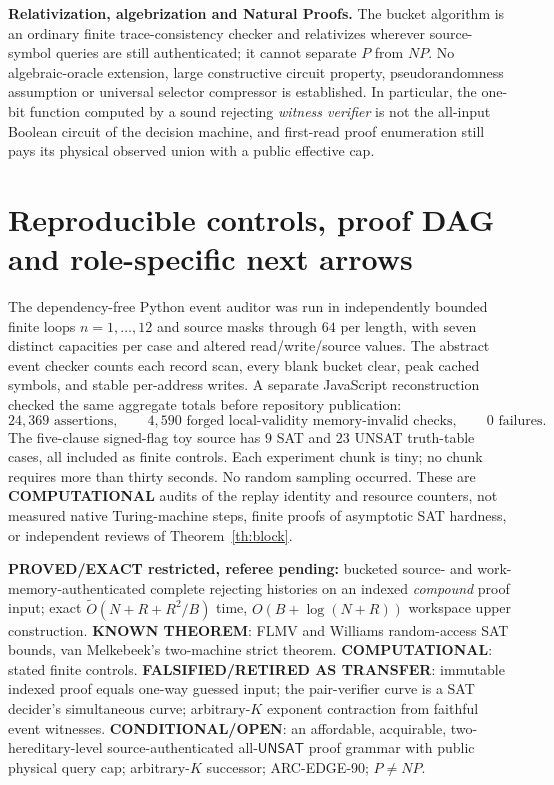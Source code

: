 \documentclass[11pt]{article}
\newcommand{\UNSAT}{\mathsf{UNSAT}}
\begin{document}
\noindent\textbf{Relativization, algebrization and Natural Proofs.}
The bucket algorithm is an ordinary finite trace-consistency checker and relativizes wherever source-symbol queries are still authenticated; it cannot separate $P$ from $NP$. No algebraic-oracle extension, large constructive circuit property, pseudorandomness assumption or universal selector compressor is established. In particular, the one-bit function computed by a sound rejecting \emph{witness verifier} is not the all-input Boolean circuit of the decision machine, and first-read proof enumeration still pays its physical observed union with a public effective cap.

\section{Reproducible controls, proof DAG and role-specific next arrows}
The dependency-free Python event auditor was run in independently bounded finite loops $n=1,\ldots,12$ and source masks through $64$ per length, with seven distinct capacities per case and altered read/write/source values. The abstract event checker counts each record scan, every blank bucket clear, peak cached symbols, and stable per-address writes. A separate JavaScript reconstruction checked the same aggregate totals before repository publication:
\[
 24{,}369\text{ assertions},\qquad
 4{,}590\text{ forged local-validity memory-invalid checks},\qquad
 0\text{ failures}.
\]
The five-clause signed-flag toy source has $9$ SAT and $23$ UNSAT truth-table cases, all included as finite controls. Each experiment chunk is tiny; no chunk requires more than thirty seconds. No random sampling occurred. These are \textbf{COMPUTATIONAL} audits of the replay identity and resource counters, not measured native Turing-machine steps, finite proofs of asymptotic SAT hardness, or independent reviews of Theorem~\ref{th:block}.

\noindent\textbf{PROVED/EXACT restricted, referee pending:} bucketed source- and work-memory-authenticated complete rejecting histories on an indexed \emph{compound} proof input; exact $\widetilde O(N+R+R^2/B)$ time, $O(B+\log(N+R))$ workspace upper construction. \textbf{KNOWN THEOREM}: FLMV and Williams random-access SAT bounds, van Melkebeek's two-machine strict theorem. \textbf{COMPUTATIONAL}: stated finite controls. \textbf{FALSIFIED/RETIRED AS TRANSFER}: immutable indexed proof equals one-way guessed input; the pair-verifier curve is a SAT decider's simultaneous curve; arbitrary-$K$ exponent contraction from faithful event witnesses. \textbf{CONDITIONAL/OPEN}: an affordable, acquirable, two-hereditary-level source-authenticated all-$\UNSAT$ proof grammar with public physical query cap; arbitrary-$K$ successor; ARC-EDGE-90; $P\ne NP$.
\end{document}
